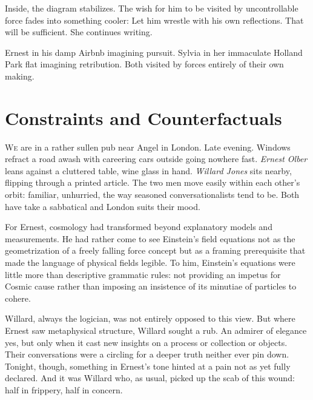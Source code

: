 Inside, the diagram stabilizes. The wish for him to be visited by uncontrollable force fades into something cooler: Let him wrestle with his own reflections. That will be sufficient. She continues writing.

Ernest in his damp Airbnb imagining pursuit. Sylvia in her immaculate Holland Park flat imagining retribution. Both visited by forces entirely of their own making.

\section*{Constraints and Counterfactuals}

\lettrine{W}e are in a rather sullen pub near Angel in London. Late evening. Windows refract a road awash with careering cars outside going nowhere fast. \textit{Ernest Olber} leans against a cluttered table, wine glass in hand. \textit{Willard Jones} sits nearby, flipping through a printed article. The two men move easily within each other’s orbit: familiar, unhurried, the way seasoned conversationalists tend to be. Both have take a sabbatical and London suits their mood.

For Ernest, cosmology had transformed beyond explanatory models and measurements. He had rather come to see Einstein's field equations not as the geometrization of a freely falling force concept but as a framing prerequisite that made the language of physical fields legible. To him, Einstein's equations were little more than descriptive grammatic rules: not providing an impetus for Cosmic cause rather than imposing an insistence of its minutiae of particles to cohere.

Willard, always the logician, was not entirely opposed to this view. But where Ernest saw metaphysical structure, Willard sought a rub. An admirer of elegance yes, but only when it cast new insights on a process or collection or objects. Their conversations were a circling for a deeper truth neither ever pin down. Tonight, though, something in Ernest’s tone hinted at a pain not as yet fully declared. And it was Willard who, as usual, picked up the scab of this wound: half in frippery, half in concern.

